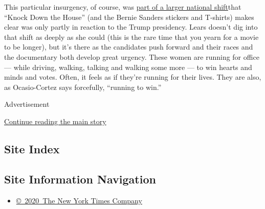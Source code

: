 This particular insurgency, of course, was
\href{https://www.nytimes3xbfgragh.onion/2017/11/08/us/politics/democrats-women-minorities.html}{part
of a larger national shift}that ``Knock Down the House'' (and the Bernie
Sanders stickers and T-shirts) makes clear was only partly in reaction
to the Trump presidency. Lears doesn't dig into that shift as deeply as
she could (this is the rare time that you yearn for a movie to be
longer), but it's there as the candidates push forward and their races
and the documentary both develop great urgency. These women are running
for office --- while driving, walking, talking and walking some more ---
to win hearts and minds and votes. Often, it feels as if they're running
for their lives. They are also, as Ocasio-Cortez says forcefully,
``running to win.''

Advertisement

\protect\hyperlink{after-bottom}{Continue reading the main story}

\hypertarget{site-index}{%
\subsection{Site Index}\label{site-index}}

\hypertarget{site-information-navigation}{%
\subsection{Site Information
Navigation}\label{site-information-navigation}}

\begin{itemize}
\tightlist
\item
  \href{https://help.nytimes3xbfgragh.onion/hc/en-us/articles/115014792127-Copyright-notice}{©~2020~The
  New York Times Company}
\end{itemize}

